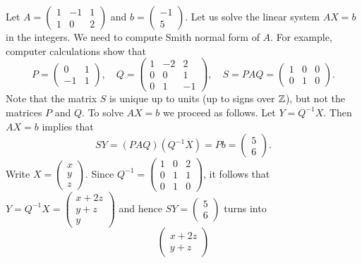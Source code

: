 \begin{example}
	Let $A=\begin{pmatrix}
		1 & -1 & 1\\
		1 & 0 & 2
	\end{pmatrix}$ and $b=\begin{pmatrix} -1 \\ 5\end{pmatrix}$. Let us solve
	the linear system $AX=b$ in the integers. We need to compute
	Smith normal form of $A$. For example, computer calculations show that
	\[
	P=\begin{pmatrix}
		0 & 1\\
		-1 & 1
	\end{pmatrix},\quad
	Q=\begin{pmatrix}
		1 & -2 & 2\\
		0 & 0 & 1\\
		0 & 1 & -1
	\end{pmatrix},
	\quad
	S=PAQ=\begin{pmatrix}
		1 & 0 & 0\\
		0 & 1 & 0
	\end{pmatrix}.
	\]
  Note that the matrix $S$ is unique up to units (up to signs over $\mathbb{Z}$), but
  not the matrices $P$ and $Q$. To solve $AX=b$ we proceed as follows. Let
  $Y=Q^{-1}X$. Then $AX=b$ implies that 
	\[
		SY=(PAQ)(Q^{-1}X)=Pb=\begin{pmatrix} 5 \\ 6\end{pmatrix}.
	\]	
	Write $X=\begin{pmatrix}
		x\\
		y\\
		z
	\end{pmatrix}$. Since $Q^{-1}=\begin{pmatrix}
		1 & 0 & 2\\
		0 & 1 & 1\\
		0 & 1 & 0
	\end{pmatrix}$, it follows that  
	$Y=Q^{-1}X=\begin{pmatrix}
		x+2z\\
		y+z\\
		y
	\end{pmatrix}$ and hence $SY=\begin{pmatrix}5\\6\end{pmatrix}$ turns into 
	\[
		\begin{pmatrix}
			x+2z\\
			y+z
		\end{pmatrix}
\]
\end{example}
